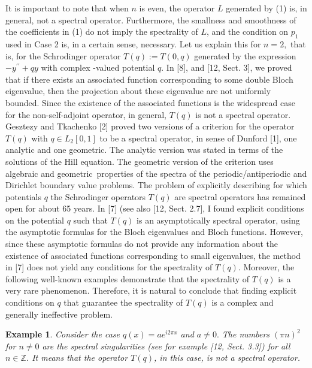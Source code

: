 \documentclass{article}%
\newtheorem{example}{Example}
\begin{document}
It is important to note that when $n$ is even, the operator $L$ generated by
(1) is, in general, not a spectral operator. Furthermore, the smallness and
smoothness of the coefficients in (1) do not imply the spectrality of $L$, and
the condition on $p_{1}$ used in Case 2 is, in a certain sense, necessary. Let
us explain this for $n=2,$ that is, for the Schrodinger operator
$T(q):=T(0,q)$ generated by the expression $-y^{\prime\prime}+qy$ with complex
-valued potential $q.$ In [8], and [12, Sect. 3], we proved that if there
exists an associated function corresponding to some double Bloch eigenvalue,
then the projection about these eigenvalue are not uniformly bounded. Since
the existence of the associated functions is the widespread case for the
non-self-adjoint operator, in general, $T(q)$ is not a spectral operator.
Gesztezy and Tkachenko [2] proved two versions of a criterion for the operator
$T(q)$ with $q\in L_{2}[0,1]$ to be a spectral operator, in sense of Dunford
[1], one analytic and one geometric. The analytic version was stated in terms
of the solutions of the Hill equation. The geometric version of the criterion
uses algebraic and geometric\ properties of the spectra of the
periodic/antiperiodic and Dirichlet boundary value problems. The problem of
explicitly describing for which potentials $q$ the Schrodinger operators
$T(q)$ are spectral operators has remained open for about 65 years. In [7]
(see also [12, Sect. 2.7], I found explicit conditions on the potential $q$
such that $T(q)$ is an asymptotically spectral operator, using the asymptotic
formulas for the Bloch eigenvalues and Bloch functions. However, since these
asymptotic formulas do not provide any information about the existence of
associated functions corresponding to small eigenvalues, the method in [7]
does not yield any conditions for the spectrality of $T(q)$. Moreover, the
following well-known examples demonstrate that the spectrality of $T(q)$ is a
very rare phenomenon. Therefore, it is natural to conclude that finding
explicit conditions on $q$ that guarantee the spectrality of $T(q)$ is a
complex and generally ineffective problem.

\begin{example}
Consider the case $q(x)=ae^{i2\pi x}$ and $a\neq0.$ The numbers $\left(  \pi
n\right)  ^{2}$ for $n\neq0$ are the spectral singularities (see for example
[12, Sect. 3.3]) for all $n\in\mathbb{Z}$. It means that the operator $T(q)$,
in this case, is not a spectral operator.
\end{example}
\end{document}
